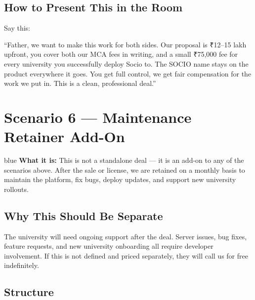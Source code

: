 \documentclass[12pt,a4paper]{article}
\begin{document}
    \subsection*{How to Present This in the Room}

    Say this:

    \begin{infobox}
    ``Father, we want to make this work for both sides. Our proposal is ₹12--15 lakh upfront, you cover both our MCA fees in writing, and a small ₹75,000 fee for every university you successfully deploy Socio to. The SOCIO name stays on the product everywhere it goes. You get full control, we get fair compensation for the work we put in. This is a clean, professional deal.''
    \end{infobox}

    \newpage
    \section{Scenario 6 — Maintenance Retainer Add-On}

    \begin{scenariobox}{blue}
    \textbf{What it is:} This is not a standalone deal — it is an add-on to any of the scenarios above. After the sale or license, we are retained on a monthly basis to maintain the platform, fix bugs, deploy updates, and support new university rollouts.
    \end{scenariobox}

    \vspace{0.4cm}

    \subsection*{Why This Should Be Separate}

    The university will need ongoing support after the deal. Server issues, bug fixes, feature requests, and new university onboarding all require developer involvement. If this is not defined and priced separately, they will call us for free indefinitely.

    \subsection*{Structure}
\end{document}
